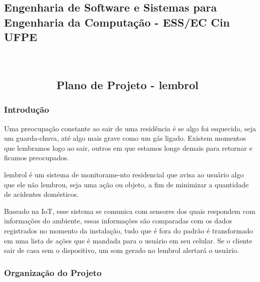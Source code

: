 \begin{center} \section*{Engenharia de Software e Sistemas para ~\newline
 Engenharia da Computação -\/ E\+S\+S/\+EC Cin U\+F\+PE }\end{center} 

\begin{center} \end{center} 

~\newline
 ~\newline


\subsection*{~~~~ ~~~~Plano de Projeto -\/ lembrol }

\subsubsection*{Introdução }

Uma preocupação constante ao sair de uma residência é se algo foi esquecido, seja um guarda-\/chuva, até algo mais grave como um gás ligado. Existem momentos que lembramos logo ao sair, outros em que estamos longe demais para retornar e ficamos preocupados.

lembrol é um sistema de monitorame-\/nto residencial que avisa ao usuário algo que ele não lembrou, seja uma ação ou objeto, a fim de minimizar a quantidade de acidentes domésticos.

Baseado na IoT, esse sistema se comunica com sensores dos quais respondem com informações do ambiente, essas informações são comparadas com os dados registrados no momento da instalação, tudo que é fora do padrão é transformado em uma lista de ações que é mandada para o usuário em seu celular. Se o cliente sair de casa sem o dispositivo, um som gerado no lembrol alertará o usuário.

\subsubsection*{Organização do Projeto }



